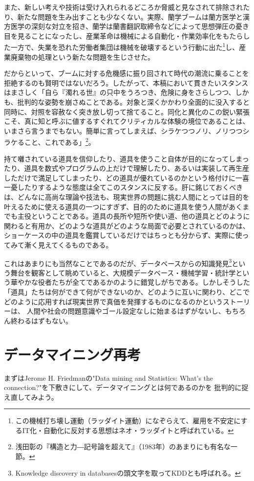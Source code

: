 また、新しい考えや技術は受け入れられるどころか脅威と見なされて排除されたり、新たな問題を生み出すことも少なくない。実際、蘭学ブームは蘭方医学と漢方医学の深刻な対立を招き、蘭学は蘭書翻訳取締令などによって思想弾圧の憂き目を見ることになったし、産業革命は機械による自動化・作業効率化をもたらした一方で、失業を恐れた労働者集団は機械を破壊するという行動に出た\footnote{この機械打ち壊し運動（ラッダイト運動）になぞらえて、雇用を不安定にするIT化・自動化に反対する思想はネオ・ラッダイトと呼ばれている。}し、産業廃棄物の処理という新たな問題を生じさせた。

だからといって、ブームに対する危機感に振り回されて時代の潮流に乗ることを拒絶するのも賢明ではないだろう。したがって、本稿において貫きたいスタンスはまさしく「自ら『濁れる世』の只中をうろつき、危険に身をさらしつつ、しかも、批判的な姿勢を崩さぬことである。対象と深くかかわり全面的に没入すると同時に、対照を容赦なく突き放し切って捨てること。同化と異化のこの鋭い緊張こそ、真に知と呼ぶに値するすぐれてクリティカルな体験の境位であることは、いまさら言うまでもない。簡単に言ってしまえば、シラケつつノリ、ノリつつシラケること、これである」\footnote{浅田彰の『構造と力―記号論を超えて』（1983年）のあまりにも有名な一節。}。

持て囃されている道具を信仰したり、道具を使うこと自体が目的になってしまったり、道具を数式やプログラムの上だけで理解したり、あるいは実装して再生産しただけで満足してしまったり、どの道具が優れているのかという格付けに一喜一憂したりするような態度は全てこのスタンスに反する。肝に銘じておくべきは、どんなに高尚な理論や技法も、現実世界の問題に挑む人間にとっては目的を叶えるために使える道具の一つにすぎず、目的のために道具を使う人間があくまでも主役ということである。道具の長所や短所や使い道、他の道具とどのように関わると有用か、どのような道具がどのような局面で必要とされているのかは、ショーケースの中の道具を鑑賞しているだけではちっとも分からず、実際に使ってみて漸く見えてくるものである。

これはあまりにも当然なことであるのだが、データベースからの知識発見\footnote{Knowledge discovery in databasesの頭文字を取ってKDDとも呼ばれる。}という舞台を観客として眺めていると、大規模データベース・機械学習・統計学という華やかな役者たちが全てであるかのように錯覚しがちである。しかしそうした「道具」たちは何ができて何ができないのか、どのように互いに関わり、どこでどのように応用すれば現実世界で真価を発揮するものになるのかというストーリーは、
人間や社会の問題意識やゴール設定なしに始まるはずがないし、もちろん終わるはずもない。

\section{データマイニング再考}
まずはJerome H. Friedmanの"Data mining and Statistics: What's the connection?"を下敷きにして、データマイニングとは何であるのかを
批判的に捉え直してみよう。


